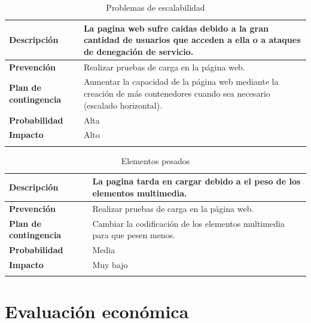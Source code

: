 \documentclass{report}
\begin{document}
        \begin{center}
            \begin{longtable}{|p{6cm}|p{6cm}|}
                \hline
                \textbf{Descripción} & La pagina web sufre caidas debido a la gran cantidad de usuarios que acceden a ella o a ataques de denegación de servicio.\\
                \hline
                \textbf{Prevención} & Realizar pruebas de carga en la página web.\\
                \hline
                \textbf{Plan de contingencia} & Aumentar la capacidad de la página web mediante la creación de más contenedores cuando sea necesario (escalado horizontal).\\
                \hline
                \textbf{Probabilidad} & Alta\\
                \hline
                \textbf{Impacto} & Alto\\
                \hline
                \caption{Problemas de escalabilidad}
            \end{longtable}
        \end{center}
        \begin{center}
            \begin{longtable}{|p{6cm}|p{6cm}|}
                \hline
                \textbf{Descripción} & La pagina tarda en cargar debido a el peso de los elementos multimedia.\\
                \hline
                \textbf{Prevención} & Realizar pruebas de carga en la página web.\\
                \hline
                \textbf{Plan de contingencia} & Cambiar la codificación de los elementos multimedia para que pesen menos.\\
                \hline
                \textbf{Probabilidad} & Media\\
                \hline
                \textbf{Impacto} & Muy bajo\\
                \hline
                \caption{Elementos pesados}
            \end{longtable}
        \end{center}
    \chapter{Evaluación económica} %
\end{document}
